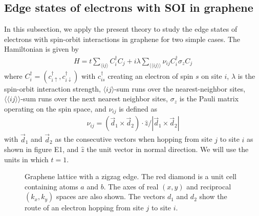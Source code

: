 \documentclass[aps,pra,amsmath,twocolumn,showpacs,bibnotes,10pt]{revtex4-1}
\begin{document}
\subsection{Edge states of electrons with SOI in graphene} 

In this subsection, we apply the present theory to study the edge states of electrons with spin-orbit interactions in graphene for two simple cases. The Hamiltonian is given by \cite{Fu2,Fu3}
\begin{eqnarray}
H = t\sum_{\langle ij\rangle}C^{\dagger}_iC_j+i\lambda\sum_{\langle\langle ij\rangle\rangle}\nu_{ij}C^{\dagger}_i\sigma_zC_j  \label{hm}
\end{eqnarray}
where $C^{\dagger}_i = (c^{\dagger}_{i\uparrow},c^{\dagger}_{i\downarrow})$ with $c^{\dagger}_{is}$ creating an electron of spin $s$ on site $i$, $\lambda$ is the spin-orbit interaction strength, $\langle ij\rangle$-sum runs over the nearest-neighbor sites, $\langle\langle ij\rangle\rangle$-sum runs over the next nearest neighbor sites, $\sigma_z$ is the Pauli matrix operating on the spin space, and $\nu_{ij}$ is defined as  
\begin{eqnarray}
\nu_{ij}=(\vec d_1\times\vec d_2)\cdot \hat z/|\vec d_1\times\vec d_2|  \label{nu}
\end{eqnarray}
with $\vec d_1$ and $\vec d_2$ as the consecutive vectors when hopping from site $j$ to site $i$ as shown in figure E1, and $\hat z$ the unit vector in normal direction. We will use the units in which $t = 1$.

\begin{figure}[t]
\centerline{}
\caption{Graphene lattice with a zigzag edge. The red diamond is a unit cell containing atoms $a$ and $b$. The axes of real $(x,y)$ and reciprocal $(k_x,k_y)$ spaces are also shown. The vectors $d_1$ and $d_2$ show the route of an electron hopping from site $j$ to site $i$.}
\end{figure}
\end{document}
